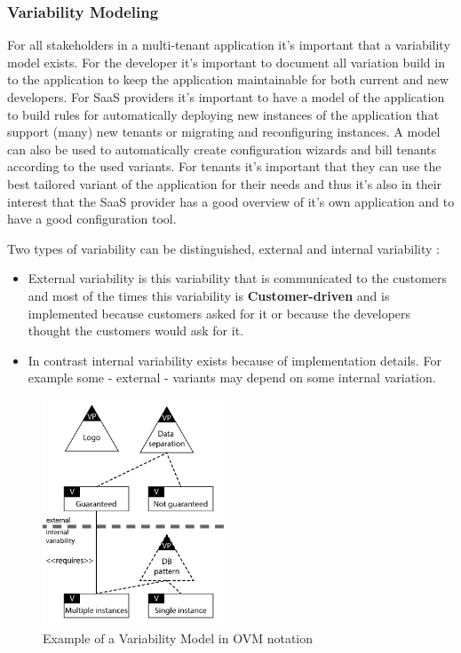 \subsubsection{Variability Modeling}
For all stakeholders in a multi-tenant application it's important that a variability model exists. For the developer it's important to document all variation build in to the application to keep the application maintainable for both current and new developers. 
For SaaS providers it's important to have a model of the application to build rules for automatically deploying new instances of the application that support (many) new tenants or migrating and reconfiguring instances. 
A model can also be used to automatically create configuration wizards and bill tenants according to the used variants. 
For tenants it's important that they can use the best tailored variant of the application for their needs and thus it's also in their interest that the SaaS provider has a good overview of it's own application and to have a good configuration tool.

Two types of variability can be distinguished, external and internal variability \cite{mietzner2009variability}:
 \begin{itemize}
\item External variability is this variability that is communicated to the customers and most of the times this variability is \textbf{Customer-driven} and is implemented because customers asked for it or because the developers thought the customers would ask for it. 
\item In contrast internal variability exists because of implementation details. For example some - external - variants may depend on some internal variation.
\end{itemize}

\begin{figure}[htr]
    \centering
    \includegraphics[width=0.48\textwidth]{assets/OVM}
    \caption{Example of a Variability Model in OVM notation}
    \label{fig:ovm}
\end{figure}

